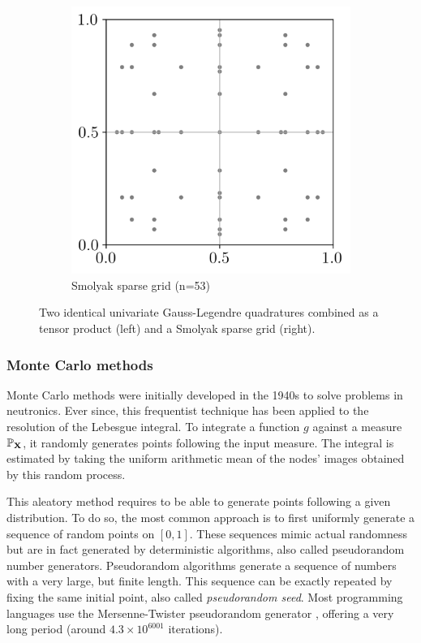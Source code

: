 \begin{figure}[h!]
\begin{subfigure}[b]{0.32\textwidth}
        \includegraphics[width=\textwidth]{../numerical_experiments/chapter1/figures/smolyak_gaussian_quadrature.png}
        \caption{Smolyak sparse grid (n=53)}
    \end{subfigure}
    \caption{Two identical univariate Gauss-Legendre quadratures combined as a tensor product (left) and a Smolyak sparse grid (right).}
    \label{fig:bivariate_quads}
\end{figure}


\subsubsection{Monte Carlo methods}
Monte Carlo methods were initially developed in the 1940s to solve problems in neutronics.  
Ever since, this frequentist technique has been applied to the resolution of the Lebesgue integral. 
To integrate a function $g$ against a measure $\mathbb{P}_{{\bf X}}$, it randomly generates points following the input measure. 
The integral is estimated by taking the uniform arithmetic mean of the nodes' images obtained by this random process. 

This aleatory method requires to be able to generate points following a given distribution. 
To do so, the most common approach is to first uniformly generate a sequence of random points on $[0, 1]$. 
These sequences mimic actual randomness but are in fact generated by deterministic algorithms, also called pseudorandom number generators. 
Pseudorandom algorithms generate a sequence of numbers with a very large, but finite length. 
This sequence can be exactly repeated by fixing the same initial point, also called \textit{pseudorandom seed}.
Most programming languages use the Mersenne-Twister pseudorandom generator \citep{matsumoto_1998}, offering a very long period (around $4.3\times10^{6001}$ iterations).

